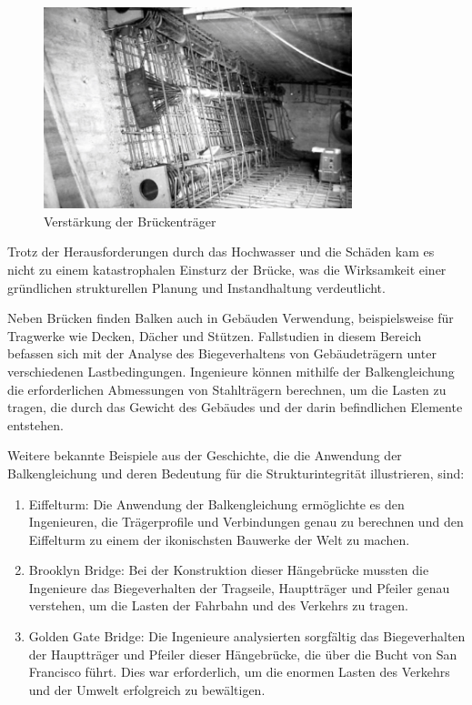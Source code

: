 \begin{figure}
\begin{center}
\includegraphics[width=0.8\textwidth]{papers/balken/images/teil3/ReussbrueckeWassen3.jpg}
\end{center}
\caption{Verstärkung der Brückenträger}
\end{figure}

Trotz der Herausforderungen durch das Hochwasser und die Schäden kam es nicht zu einem katastrophalen Einsturz der Brücke, was die Wirksamkeit einer gründlichen strukturellen Planung und Instandhaltung verdeutlicht.

Neben Brücken finden Balken auch in Gebäuden Verwendung, beispielsweise für Tragwerke wie Decken, Dächer und Stützen.
Fallstudien in diesem Bereich befassen sich mit der Analyse des Biegeverhaltens von Gebäudeträgern unter verschiedenen Lastbedingungen. Ingenieure können mithilfe der Balkengleichung die erforderlichen Abmessungen von Stahlträgern berechnen, um die Lasten zu tragen, die durch das Gewicht des Gebäudes und der darin befindlichen Elemente entstehen.

Weitere bekannte Beispiele aus der Geschichte, die die Anwendung der Balkengleichung und deren Bedeutung für die Strukturintegrität illustrieren, sind:
\begin{enumerate}
\item Eiffelturm:
Die Anwendung der Balkengleichung ermöglichte es den Ingenieuren, die Trägerprofile und Verbindungen genau zu berechnen und den Eiffelturm zu einem der ikonischsten Bauwerke der Welt zu machen.
\item Brooklyn Bridge:
Bei der Konstruktion dieser Hängebrücke mussten die Ingenieure das Biegeverhalten der Tragseile, Hauptträger und Pfeiler genau verstehen, um die Lasten der Fahrbahn und des Verkehrs zu tragen.
\item Golden Gate Bridge:
Die Ingenieure analysierten sorgfältig das Biegeverhalten der Hauptträger und Pfeiler dieser Hängebrücke, die über die Bucht von San Francisco führt. Dies war erforderlich, um die enormen Lasten des Verkehrs und der Umwelt erfolgreich zu bewältigen.
\end{enumerate}

